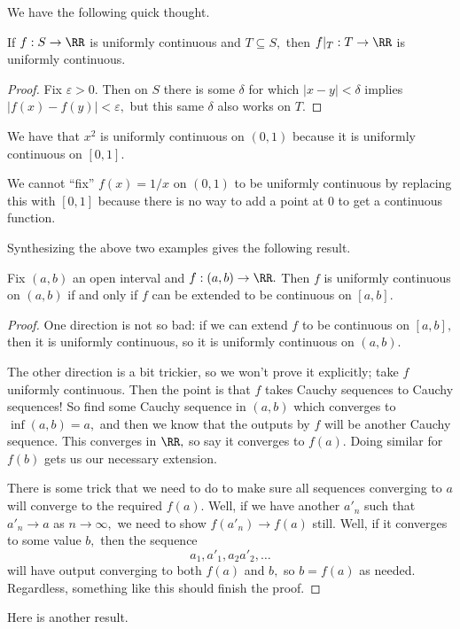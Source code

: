 We have the following quick thought.
\begin{proposition}
	If $f:S\to\RR$ is uniformly continuous and $T\subseteq S,$ then $f|_T:T\to\RR$ is uniformly continuous. 
\end{proposition}
\begin{proof}
	Fix $\varepsilon>0.$ Then on $S$ there is some $\delta$ for which $|x-y|<\delta$ implies $|f(x)-f(y)|<\varepsilon,$ but this same $\delta$ also works on $T.$
\end{proof}
\begin{example}
	We have that $x^2$ is uniformly continuous on $(0,1)$ because it is uniformly continuous on $[0,1].$
\end{example}
\begin{nex}
	We cannot ``fix'' $f(x)=1/x$ on $(0,1)$ to be uniformly continuous by replacing this with $[0,1]$ because there is no way to add a point at $0$ to get a continuous function.
\end{nex}
Synthesizing the above two examples gives the following result.
\begin{theorem}
	Fix $(a,b)$ an open interval and $f:(a,b)\to\RR.$ Then $f$ is uniformly continuous on $(a,b)$ if and only if $f$ can be extended to be continuous on $[a,b].$
\end{theorem}
\begin{proof}
	One direction is not so bad: if we can extend $f$ to be continuous on $[a,b],$ then it is uniformly continuous, so it is uniformly continuous on $(a,b).$

	The other direction is a bit trickier, so we won't prove it explicitly; take $f$ uniformly continuous. Then the point is that $f$ takes Cauchy sequences to Cauchy sequences! So find some Cauchy sequence in $(a,b)$ which converges to $\inf(a,b)=a,$ and then we know that the outputs by $f$ will be another Cauchy sequence. This converges in $\RR,$ so say it converges to $f(a).$ Doing similar for $f(b)$ gets us our necessary extension.

	There is some trick that we need to do to make sure all sequences converging to $a$ will converge to the required $f(a).$ Well, if we have another $a'_n$ such that $a'_n\to a$ as $n\to\infty,$ we need to show $f(a'_n)\to f(a)$ still. Well, if it converges to some value $b,$ then the sequence
	\[a_1,a'_1,a_2 a'_2,\ldots\]
	will have output converging to both $f(a)$ and $b,$ so $b=f(a)$ as needed. Regardless, something like this should finish the proof.
\end{proof}
Here is another result.
